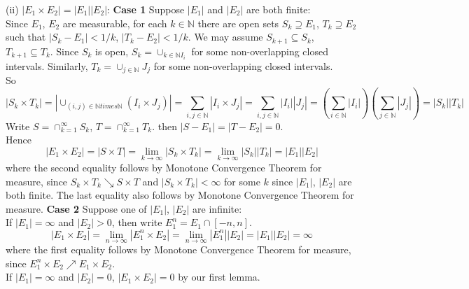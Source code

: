 \documentclass[a4paper,11pt]{article}
\begin{document}
\begin{enumerate}
(ii) $|E_1 \times E_2| = |E_1||E_2|$:
\newline
\textbf {Case 1} Suppose $|E_1|$ and $|E_2|$ are both finite:\\
Since $E_1$, $E_2$ are measurable, for each $k \in \mathbb{N}$ there are open sets $S_k \supseteq E_1$, $T_k \supseteq E_2$ such that $|S_k - E_1| < 1/k$, $|T_k - E_2| < 1/k$. We may assume $S_{k+1} \subseteq S_k$, $T_{k+1} \subseteq T_k$.
\newline
\newline
Since $S_k$ is open, $S_k = \cup_{k \in \mathbb{N} I_i}$ for some non-overlapping closed intervals. Similarly, $T_k = \cup_{j \in \mathbb{N}} J_j$ for some non-overlapping closed intervals.\\
So
$$|S_k \times T_k| = |\cup_{(i,j) \in \mathbb{N} times \mathbb{N}} (I_i \times J_j)| = \sum_{i, j \in \mathbb{N}} |I_i \times J_j| = \sum_{i, j \in \mathbb{N}} |I_i||J_j| = (\sum_{i \in \mathbb{N}} |I_i|) (\sum_{j \in \mathbb{N}} |J_j|) = |S_k||T_k|$$
Write $S = \cap_{k = 1}^{\infty} S_k$, $T = \cap_{k = 1}^{\infty} T_k$. then $|S - E_1| = |T - E_2| = 0$.\\
Hence
$$|E_1 \times E_2| = |S \times T| = \lim_{k \to \infty} |S_k \times T_k| = \lim_{k \to \infty}|S_k||T_k| = |E_1||E_2|$$
where the second equality follows by Monotone Convergence Theorem for measure, since $S_k \times T_k \searrow S \times T$ and $|S_k \times T_k| < \infty$ for some $k$ since $|E_1|$, $|E_2|$ are both finite. The last equality also follows by Monotone Convergence Theorem for measure.
\newline
\newline
\textbf {Case 2} Suppose one of $|E_1|$, $|E_2|$ are infinite:\\
If $|E_1| = \infty$ and $|E_2| > 0$, then write $E_1^n = E_1 \cap [-n, n]$.
$$|E_1 \times E_2| = \lim_{n \to \infty} |E_1^n \times E_2| = \lim_{n \to \infty} |E_1^n||E_2| = |E_1||E_2| = \infty$$
where the first equality follows by Monotone Convergence Theorem for measure, since $E_1^n \times E_2 \nearrow E_1 \times E_2$.\\
If $|E_1| = \infty$ and $|E_2| = 0$, $|E_1 \times E_2| = 0$ by our first lemma.
\newline
\newline



\end{enumerate}
\end{document}
